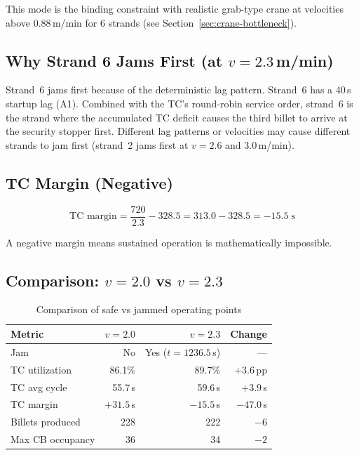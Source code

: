 \documentclass[11pt,a4paper]{article}
\begin{document}
This mode is the binding constraint with realistic grab-type crane at velocities above 0.88\,m/min for 6 strands (see Section~\ref{sec:crane-bottleneck}).

\subsection{Why Strand 6 Jams First (at $v = 2.3$\,m/min)}

Strand~6 jams first because of the deterministic lag pattern. Strand~6 has a 40\,s startup lag (A1). Combined with the TC's round-robin service order, strand~6 is the strand where the accumulated TC deficit causes the third billet to arrive at the security stopper first. Different lag patterns or velocities may cause different strands to jam first (strand~2 jams first at $v = 2.6$ and 3.0\,m/min).

\subsection{TC Margin (Negative)}

\begin{equation}
\text{TC margin} = \frac{720}{2.3} - 328.5 = 313.0 - 328.5 = -15.5\;\text{s}
\end{equation}

A negative margin means sustained operation is mathematically impossible.

\subsection{Comparison: $v = 2.0$ vs $v = 2.3$}

\begin{table}[H]
\centering
\caption{Comparison of safe vs jammed operating points}
\label{tab:compare-2.0-2.3}
\begin{tabular}{@{}lrrr@{}}
\toprule
Metric & $v = 2.0$ & $v = 2.3$ & Change \\
\midrule
Jam & No & Yes ($t{=}1236.5$\,s) & --- \\
TC utilization & 86.1\% & 89.7\% & $+3.6$\,pp \\
TC avg cycle & 55.7\,s & 59.6\,s & $+3.9$\,s \\
TC margin & $+31.5$\,s & $-15.5$\,s & $-47.0$\,s \\
Billets produced & 228 & 222 & $-6$ \\
Max CB occupancy & 36 & 34 & $-2$ \\
\bottomrule
\end{tabular}
\end{table}
\end{document}
